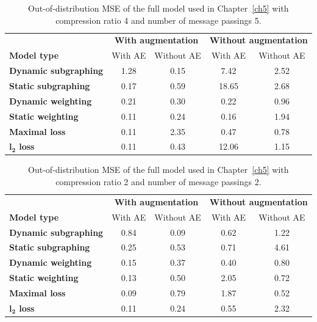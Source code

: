\begin{appendices}
\begin{table}
\centering
\caption{Out-of-distribution MSE of the full model used in Chapter~\ref{ch5} with compression ratio 4 and number of message passings 5.}
\label{table_4_5}
\begin{tabular}{lcccc}
\toprule
 & \multicolumn{2}{c}{\textbf{With augmentation}} & \multicolumn{2}{c}{\textbf{Without augmentation}} \\
 \cmidrule{2-3} \cmidrule{4-5}
\textbf{Model type} & With AE & Without AE & With AE & Without AE \\
\midrule
\textbf{Dynamic subgraphing} & 1.28 & 0.15 & 7.42 & 2.52 \\
\textbf{Static subgraphing} & 0.17 & 0.59 & 18.65 & 2.68 \\
\textbf{Dynamic weighting} & 0.21 & 0.30 & 0.22 & 0.96 \\
\textbf{Static weighting} & 0.11 & 0.24 & 0.16 & 1.94 \\
\textbf{Maximal loss} & 0.11 & 2.35 & 0.47 & 0.78 \\
\textbf{$\boldsymbol{l_2}$ loss} & 0.11 & 0.43 & 12.06 & 1.15 \\
\bottomrule
\end{tabular}
\end{table}

\begin{table}
\centering
\caption{Out-of-distribution MSE of the full model used in Chapter~\ref{ch5} with compression ratio 2 and number of message passings 2.}
\label{table_2_2}
\begin{tabular}{lcccc}
\toprule
 & \multicolumn{2}{c}{\textbf{With augmentation}} & \multicolumn{2}{c}{\textbf{Without augmentation}} \\
 \cmidrule{2-3} \cmidrule{4-5}
\textbf{Model type} & With AE & Without AE & With AE & Without AE \\
\midrule
\textbf{Dynamic subgraphing} & 0.84 & 0.09 & 0.62 & 1.22 \\
\textbf{Static subgraphing} & 0.25 & 0.53 & 0.71 & 4.61 \\
\textbf{Dynamic weighting} & 0.15 & 0.37 & 0.40 & 0.80 \\
\textbf{Static weighting} & 0.13 & 0.50 & 2.05 & 0.72 \\
\textbf{Maximal loss} & 0.09 & 0.79 & 1.87 & 0.52 \\
\textbf{$\boldsymbol{l_2}$ loss} & 0.11 & 0.24 & 0.55 & 2.32 \\
\bottomrule
\end{tabular}
\end{table}


\end{appendices}
